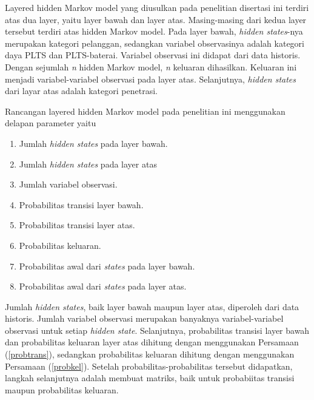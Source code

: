 {Layered hidden Markov model yang diusulkan pada penelitian disertasi ini terdiri atas dua layer, yaitu layer bawah dan layer atas. Masing-masing dari kedua layer tersebut terdiri atas hidden Markov model. Pada layer bawah, \textit{hidden states}-nya merupakan kategori pelanggan, sedangkan variabel observasinya adalah kategori daya PLTS dan PLTS-baterai. Variabel observasi ini didapat dari data historis. Dengan sejumlah \textit{n} hidden Markov model, \textit{n} keluaran dihasilkan. Keluaran ini menjadi variabel-variabel observasi pada layer atas. Selanjutnya, \textit{hidden states} dari layar atas adalah kategori penetrasi. 

Rancangan layered hidden Markov model pada penelitian ini menggunakan delapan parameter yaitu
\begin{enumerate}
	\item Jumlah \textit{hidden states} pada layer bawah. 
	\item Jumlah \textit{hidden states} pada layer atas
	\item Jumlah variabel observasi.
	\item Probabilitas transisi layer bawah.
	\item Probabilitas transisi layer atas.
	\item Probabilitas keluaran.
	\item Probabilitas awal dari \textit{states} pada layer bawah.
	\item Probabilitas awal dari \textit{states} pada layer atas.
\end{enumerate}
Jumlah \textit{hidden states}, baik layer bawah maupun layer atas, diperoleh dari data historis. Jumlah variabel observasi merupakan banyaknya variabel-variabel observasi untuk setiap \textit{hidden state}. Selanjutnya, probabilitas transisi layer bawah dan probabilitas keluaran layer atas dihitung dengan menggunakan Persamaan (\ref{probtrans}), sedangkan probabilitas keluaran dihitung dengan menggunakan Persamaan (\ref{probkel}). Setelah probabilitas-probabilitas tersebut didapatkan, langkah selanjutnya adalah membuat matriks, baik untuk probabiitas transisi maupun probabilitas keluaran.

}
